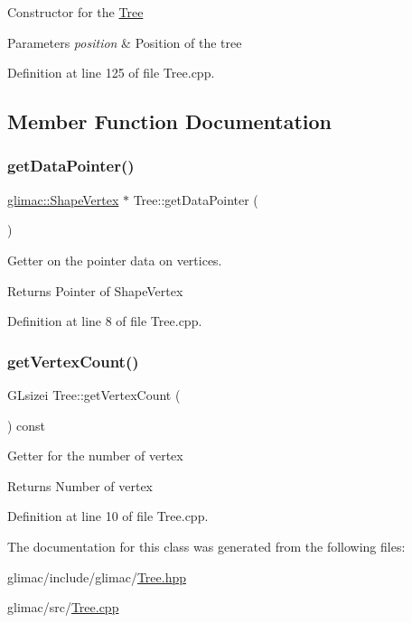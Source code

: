 Constructor for the \hyperlink{class_tree}{Tree} 
\begin{DoxyParams}{Parameters}
{\em position} & Position of the tree \\
\hline
\end{DoxyParams}


Definition at line 125 of file Tree.\+cpp.



\subsection{Member Function Documentation}
\mbox{\label{class_tree_a237b223e9f1d85d144e17094b62d2fdf}} 
\subsubsection{\texorpdfstring{get\+Data\+Pointer()}{getDataPointer()}}
{\footnotesize\ttfamily \hyperlink{structglimac_1_1_shape_vertex}{glimac\+::\+Shape\+Vertex} $\ast$ Tree\+::get\+Data\+Pointer (\begin{DoxyParamCaption}{ }\end{DoxyParamCaption})}

Getter on the pointer data on vertices. \begin{DoxyReturn}{Returns}
Pointer of Shape\+Vertex 
\end{DoxyReturn}


Definition at line 8 of file Tree.\+cpp.

\mbox{\label{class_tree_aa23fb35f512dc74807ef7190eebb5a88}} 
\subsubsection{\texorpdfstring{get\+Vertex\+Count()}{getVertexCount()}}
{\footnotesize\ttfamily G\+Lsizei Tree\+::get\+Vertex\+Count (\begin{DoxyParamCaption}{ }\end{DoxyParamCaption}) const}

Getter for the number of vertex \begin{DoxyReturn}{Returns}
Number of vertex 
\end{DoxyReturn}


Definition at line 10 of file Tree.\+cpp.



The documentation for this class was generated from the following files\+:\begin{DoxyCompactItemize}
\item 
glimac/include/glimac/\hyperlink{_tree_8hpp}{Tree.\+hpp}\item 
glimac/src/\hyperlink{_tree_8cpp}{Tree.\+cpp}\end{DoxyCompactItemize}
